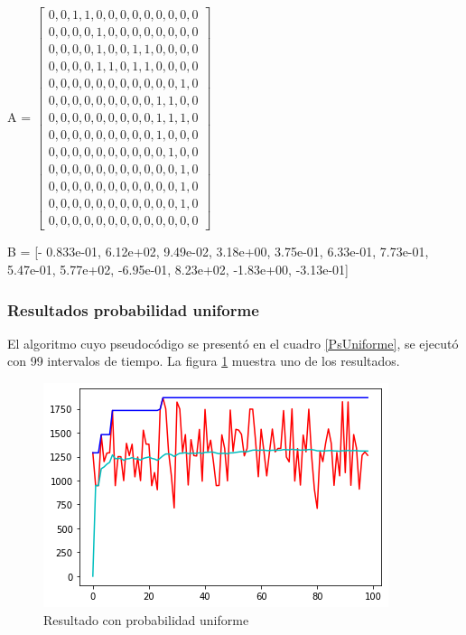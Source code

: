 \renewcommand{\arraystretch}{0.5}
A = 
$\begin{bmatrix}

0, 0, 1,  1,  0,  0,  0,  0,  0,  0,  0,  0,  0\\
0, 0, 0,  0,  1,  0,  0,  0,  0,  0,  0,  0,  0\\
0, 0, 0,  0,  1,  0,  0,  1,  1,  0,  0,  0,  0\\
0, 0, 0,  0,  1,  1,  0,  1,  1,  0,  0,  0,  0\\
0, 0, 0,  0,  0,  0,  0,  0,  0,  0,  0,  1,  0\\
0, 0, 0,  0,  0,  0,  0,  0,  0,  1,  1,  0,  0\\
0, 0, 0,  0,  0,  0,  0,  0,  0,  1,  1,  1,  0\\
0, 0, 0,  0,  0,  0,  0,  0,  0,  1,  0,  0,  0\\
0, 0, 0,  0,  0,  0,  0,  0,  0,  0,  1,  0,  0\\
0, 0, 0,  0,  0,  0,  0,  0,  0,  0,  0,  1,  0\\
0, 0, 0,  0,  0,  0,  0,  0,  0,  0,  0,  1,  0\\
0, 0, 0,  0,  0,  0,  0,  0,  0,  0,  0,  1,  0\\
0, 0, 0,  0,  0,  0,  0,  0,  0,  0,  0,  0,  0
\end{bmatrix}$



B = [- 0.833e-01, 6.12e+02, 9.49e-02, 3.18e+00, 3.75e-01, 6.33e-01, 7.73e-01, 5.47e-01, 5.77e+02, -6.95e-01, 8.23e+02, -1.83e+00, -3.13e-01]

\subsubsection{Resultados probabilidad uniforme}

El algoritmo cuyo pseudocódigo se presentó en el cuadro \ref{PsUniforme}, se ejecutó con 99 intervalos de tiempo. La figura \ref{fig:uniforme} muestra uno de los resultados. 

\begin{figure}[H]
	\centering
	\includegraphics[scale=1]{Uniforme}
	\caption{Resultado con probabilidad uniforme}
	\label{fig:uniforme}
\end{figure}

